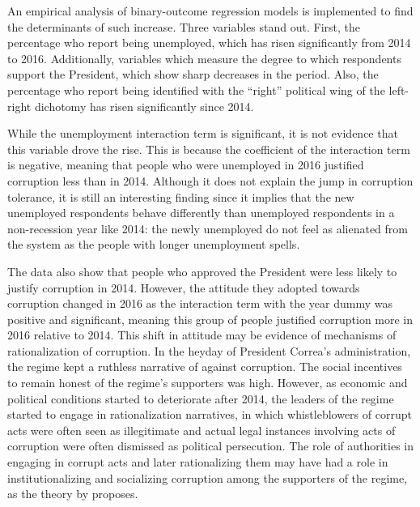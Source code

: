 \documentclass[12pt,a4]{article}\usepackage[]{graphicx}\usepackage[]{xcolor}
\begin{document}
An empirical analysis of binary-outcome regression models is implemented to find the determinants of such increase. Three variables stand out. First, the percentage who report being unemployed, which has risen significantly from 2014 to 2016. Additionally, variables which measure the degree to which respondents support the President, which show sharp decreases in the period. Also, the percentage who report being identified with the \enquote{right} political wing of the left-right dichotomy has risen significantly since 2014.

While the unemployment interaction term is significant, it is not evidence that this variable drove the rise. This is because the coefficient of the interaction term is negative, meaning that people who were unemployed in 2016 justified corruption less than in 2014. Although it does not explain the jump in corruption tolerance, it is still an interesting finding since it implies that the new unemployed respondents behave differently than unemployed respondents in a non-recession year like 2014: the newly unemployed do not feel as alienated from the system as the people with longer unemployment spells.

The data also show that people who approved the President were less likely to justify corruption in 2014. However, the attitude they adopted towards corruption changed in 2016 as the interaction term with the year dummy was positive and significant, meaning this group of people justified corruption more in 2016 relative to 2014. This shift in attitude may be evidence of mechanisms of rationalization of corruption. In the heyday of President Correa's administration, the regime kept a ruthless narrative of against corruption. The social incentives to remain honest of the regime's supporters was high. However, as economic and political conditions started to deteriorate after 2014, the leaders of the regime started to engage in rationalization narratives, in which whistleblowers of corrupt acts were often seen as illegitimate and actual legal instances involving acts of corruption were often dismissed as political persecution. The role of authorities in engaging in corrupt acts and later rationalizing them may have had a role in institutionalizing and socializing corruption among the supporters of the regime, as the theory by \textcite{Ashforth.2003} proposes.
\end{document}
